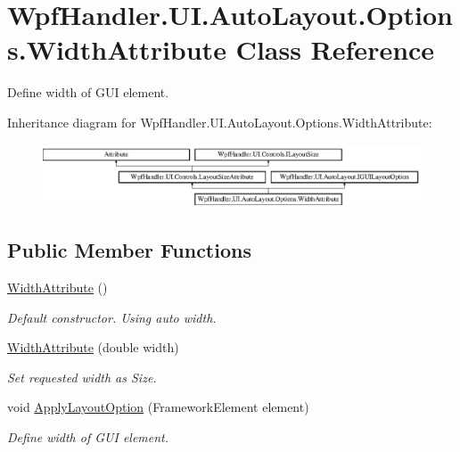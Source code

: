 \hypertarget{class_wpf_handler_1_1_u_i_1_1_auto_layout_1_1_options_1_1_width_attribute}{}\section{Wpf\+Handler.\+U\+I.\+Auto\+Layout.\+Options.\+Width\+Attribute Class Reference}
\label{class_wpf_handler_1_1_u_i_1_1_auto_layout_1_1_options_1_1_width_attribute}


Define width of G\+UI element.  


Inheritance diagram for Wpf\+Handler.\+U\+I.\+Auto\+Layout.\+Options.\+Width\+Attribute\+:\begin{figure}[H]
\begin{center}
\leavevmode
\includegraphics[height=1.872910cm]{d6/d44/class_wpf_handler_1_1_u_i_1_1_auto_layout_1_1_options_1_1_width_attribute}
\end{center}
\end{figure}
\subsection*{Public Member Functions}
\begin{DoxyCompactItemize}
\item 
\mbox{\hyperlink{class_wpf_handler_1_1_u_i_1_1_auto_layout_1_1_options_1_1_width_attribute_a6f7d00386300a62fc4abfbc98ea64dac}{Width\+Attribute}} ()
\begin{DoxyCompactList}\small\item\em Default constructor. Using auto width. \end{DoxyCompactList}\item 
\mbox{\hyperlink{class_wpf_handler_1_1_u_i_1_1_auto_layout_1_1_options_1_1_width_attribute_ad003db268061c52fdb4330dd9b57cda8}{Width\+Attribute}} (double width)
\begin{DoxyCompactList}\small\item\em Set requested width as Size. \end{DoxyCompactList}\item 
void \mbox{\hyperlink{class_wpf_handler_1_1_u_i_1_1_auto_layout_1_1_options_1_1_width_attribute_afdff5891e40ae82fc6282d78753ff644}{Apply\+Layout\+Option}} (Framework\+Element element)
\begin{DoxyCompactList}\small\item\em Define width of G\+UI element. \end{DoxyCompactList}\end{DoxyCompactItemize}
